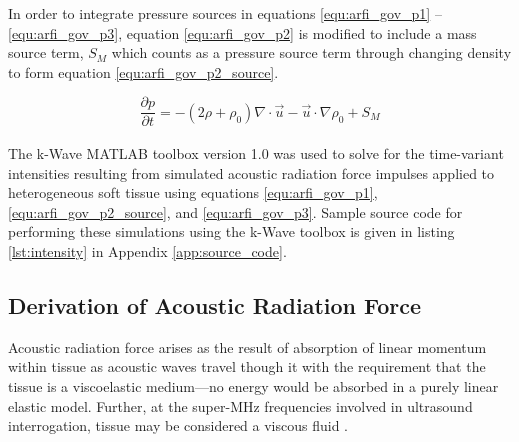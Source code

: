 			In order to integrate pressure sources in equations \ref{equ:arfi_gov_p1} -- \ref{equ:arfi_gov_p3}, equation \ref{equ:arfi_gov_p2} is modified to include a mass source term, $S_M$ which counts as a pressure source term through changing density to form equation \ref{equ:arfi_gov_p2_source}.

			\begin{equation}
				\label{equ:arfi_gov_p2_source}
				\frac{\partial p}{\partial t} = -\left(2 \rho + \rho_0\right)\nabla \cdot \vec{u} - \vec{u} \cdot \nabla \rho_0 + S_M
			\end{equation}

			The k-Wave MATLAB\textsuperscript{\textregistered} toolbox version 1.0 was used to solve for the time-variant intensities resulting from simulated acoustic radiation force impulses applied to heterogeneous soft tissue using equations \ref{equ:arfi_gov_p1}, \ref{equ:arfi_gov_p2_source}, and \ref{equ:arfi_gov_p3}. Sample source code for performing these simulations using the k-Wave toolbox is given in listing \ref{lst:intensity} in Appendix \ref{app:source_code}.

		\subsection{Derivation of Acoustic Radiation Force}
		\label{subsec:body_load_derivation}
			Acoustic radiation force arises as the result of absorption of linear momentum within tissue as acoustic waves travel though it with the requirement that the tissue is a viscoelastic medium---no energy would be absorbed in a purely linear elastic model. Further, at the super-\si{\MHz} frequencies involved in ultrasound interrogation, tissue may be considered a viscous fluid .

